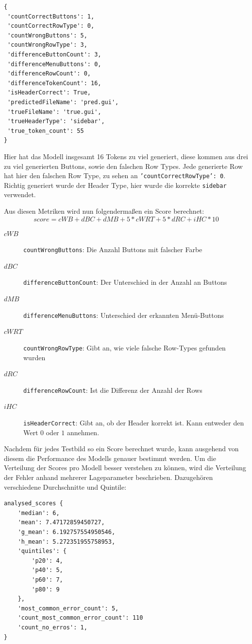 \documentclass[pdftex,a4paper,halfparskip, article]{scrartcl}
\begin{document}
\begin{verbatim}
{
 'countCorrectButtons': 1,
 'countCorrectRowType': 0,
 'countWrongButtons': 5,
 'countWrongRowType': 3,
 'differenceButtonCount': 3,
 'differenceMenuButtons': 0,
 'differenceRowCount': 0,
 'differenceTokenCount': 16,
 'isHeaderCorrect': True,
 'predictedFileName': 'pred.gui',
 'trueFileName': 'true.gui',
 'trueHeaderType': 'sidebar',
 'true_token_count': 55
}
\end{verbatim}


Hier hat das Modell insgesamt 16 Tokens zu viel generiert, diese kommen aus drei zu viel generierten Buttons, sowie den falschen Row Types. Jede generierte Row hat hier den falschen Row Type, zu sehen an \texttt{'countCorrectRowType': 0}. Richtig generiert wurde der Header Type, hier wurde die korrekte \texttt{sidebar} verwendet.

Aus diesen Metriken wird nun folgendermaßen ein Score berechnet:        
\begin{equation}
score = cWB + dBC + dMB + 5 * cWRT + 5 * dRC + iHC * 10
\end{equation}

\begin{description}
	\item[$cWB$] \texttt{countWrongButtons}: Die Anzahl Buttons mit falscher Farbe
	\item[$dBC$] \texttt{differenceButtonCount}: Der Unterschied in der Anzahl an Buttons
	\item[$dMB$] \texttt{differenceMenuButtons}: Unterschied der erkannten Menü-Buttons
	\item[$cWRT$] \texttt{countWrongRowType}: Gibt an, wie viele falsche Row-Types gefunden wurden
	\item[$dRC$] \texttt{differenceRowCount}: Ist die Differenz der Anzahl der Rows
	\item[$iHC$] \texttt{isHeaderCorrect}: Gibt an, ob der Header korrekt ist. Kann entweder den Wert $0$ oder $1$ annehmen.	
\end{description}

Nachdem für jedes Testbild so ein Score berechnet wurde, kann ausgehend von diesem die Performance des Modells genauer bestimmt werden. Um die Verteilung der Scores pro Modell besser verstehen zu können, wird die Verteilung der Fehler anhand mehrerer Lageparameter beschrieben. Dazugehören verschiedene Durchschnitte und Quintile:

  \begin{verbatim}
analysed_scores {
    'median': 6, 
    'mean': 7.47172859450727, 
    'g_mean': 6.192757554950546, 
    'h_mean': 5.272351955758953, 
    'quintiles': {
        'p20': 4,
        'p40': 5, 
        'p60': 7, 
        'p80': 9 
	},
    'most_common_error_count': 5, 
    'count_most_common_error_count': 110
    'count_no_erros': 1, 
}
 \end{verbatim}
\end{document}
